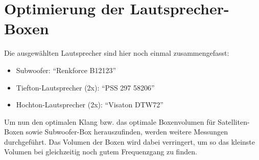 

\newpage
\section{Optimierung der Lautsprecher-Boxen}\label{sec:4.4}
Die ausgewählten Lautsprecher sind hier noch einmal zusammengefasst:
\begin{itemize}
	\item Subwoofer: \enquote{Renkforce B12123}
	\item Tiefton-Lautsprecher (2x): \enquote{PSS 297 58206}
	\item Hochton-Lautsprecher (2x): \enquote{Visaton DTW72}
\end{itemize}
Um nun den optimalen Klang bzw. das optimale Boxenvolumen für Satelliten-Boxen sowie Subwoofer-Box herauszufinden, werden weitere Messungen durchgeführt.
Das Volumen der Boxen wird dabei verringert, um so das kleinste Volumen bei gleichzeitig noch gutem Frequenzgang zu finden.

